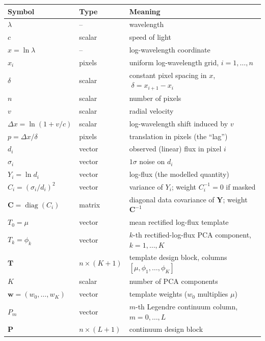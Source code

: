 \documentclass[11pt]{article}
\newcommand{\dx}{\Delta x}                     %
\newcommand{\diag}{\operatorname{diag}}
\begin{document}
\begin{table}[h]
\centering
\small
\begin{tabular}{@{}llp{}@{}}
\toprule
Symbol & Type & Meaning \\
\midrule
$\lambda$            & --        & wavelength \\
$c$                  & scalar    & speed of light \\
$x=\ln\lambda$       & --        & log-wavelength coordinate \\
$x_i$                & pixels    & uniform log-wavelength grid, $i=1,\dots,n$ \\
$\delta$             & scalar    & constant pixel spacing in $x$, $\;\delta=x_{i+1}-x_i$ \\
$n$                  & scalar    & number of pixels \\[2pt]
$v$                  & scalar    & radial velocity \\
$\dx=\ln(1+v/c)$     & scalar    & log-wavelength shift induced by $v$ \\
$p=\dx/\delta$       & pixels    & translation in pixels (the ``lag'') \\[2pt]
$d_i$                & vector    & observed (linear) flux in pixel $i$ \\
$\sigma_i$           & vector    & $1\sigma$ noise on $d_i$ \\
$Y_i=\ln d_i$        & vector    & log-flux (the modelled quantity) \\
$C_i=(\sigma_i/d_i)^2$ & vector  & variance of $Y_i$; weight $C_i^{-1}=0$ if masked \\
$\mathbf{C}=\diag(C_i)$ & matrix & diagonal data covariance of $\mathbf{Y}$; weight $\mathbf{C}^{-1}$ \\[2pt]
$T_0=\mu$            & vector    & mean rectified log-flux template \\
$T_k=\phi_k$         & vector    & $k$-th rectified-log-flux PCA component, $k=1,\dots,K$ \\
$\mathbf{T}$         & $n\times(K{+}1)$ & template design block, columns $[\mu,\phi_1,\dots,\phi_K]$ \\
$K$                  & scalar    & number of PCA components \\
$\mathbf{w}=(w_0,\dots,w_K)$ & vector & template weights ($w_0$ multiplies $\mu$) \\[2pt]
$P_m$                & vector    & $m$-th Legendre continuum column, $m=0,\dots,L$ \\
$\mathbf{P}$         & $n\times(L{+}1)$ & continuum design block \\

\end{tabular}
\end{table}
\end{document}
